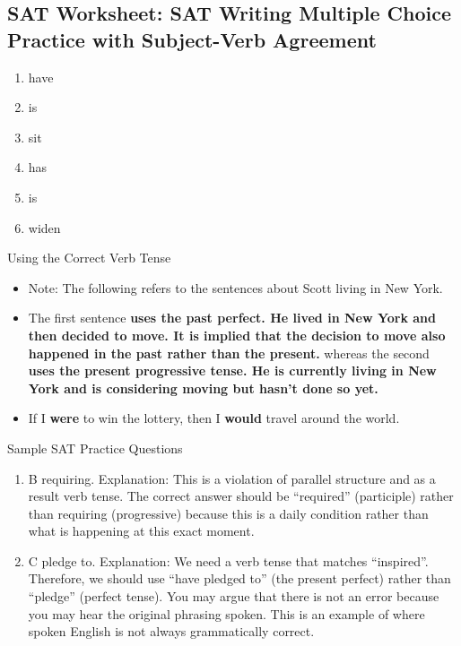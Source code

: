 \subsection{SAT Worksheet: SAT Writing Multiple Choice Practice with Subject-Verb Agreement}

\begin{enumerate}
\item have
\item is
\item sit
\item has
\item is
\item widen
\end{enumerate}

\bigskip
Using the Correct Verb Tense

\begin{itemize}
\item Note: The following refers to the sentences about Scott living in New York.

\item The first sentence \textbf{uses the past perfect. He lived in New York and then decided to move. It is implied that the decision to move also happened in the past rather than the present.} whereas the second \textbf{uses the present progressive tense. He is currently living in New York and is considering moving but hasn't done so yet.}

\item If I \textbf{were} to win the lottery, then I \textbf{would} travel around the world.
\end{itemize}

\bigskip Sample SAT Practice Questions

\bigskip
\begin{enumerate}
\item B requiring. Explanation: This is a violation of parallel structure and as a result verb tense. The correct answer should be ``required'' (participle) rather than requiring (progressive) because this is a daily condition rather than what is happening at this exact moment. 

\item C pledge to. Explanation: We need a verb tense that matches ``inspired''. Therefore, we should use ``have pledged to'' (the present perfect) rather than ``pledge'' (perfect tense). You may argue that there is not an error because you may hear the original phrasing spoken. This is an example of where spoken English is not always grammatically correct. 
\end{enumerate}

